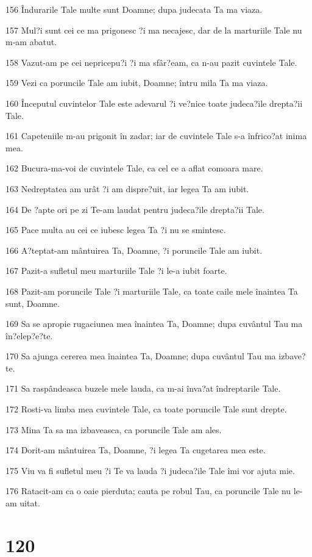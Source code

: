 \par 156 Îndurarile Tale multe sunt Doamne; dupa judecata Ta ma viaza.
\par 157 Mul?i sunt cei ce ma prigonesc ?i ma necajesc, dar de la marturiile Tale nu m-am abatut.
\par 158 Vazut-am pe cei nepricepu?i ?i ma sfâr?eam, ca n-au pazit cuvintele Tale.
\par 159 Vezi ca poruncile Tale am iubit, Doamne; întru mila Ta ma viaza.
\par 160 Începutul cuvintelor Tale este adevarul ?i ve?nice toate judeca?ile drepta?ii Tale.
\par 161 Capeteniile m-au prigonit în zadar; iar de cuvintele Tale s-a înfrico?at inima mea.
\par 162 Bucura-ma-voi de cuvintele Tale, ca cel ce a aflat comoara mare.
\par 163 Nedreptatea am urât ?i am dispre?uit, iar legea Ta am iubit.
\par 164 De ?apte ori pe zi Te-am laudat pentru judeca?ile drepta?ii Tale.
\par 165 Pace multa au cei ce iubesc legea Ta ?i nu se smintesc.
\par 166 A?teptat-am mântuirea Ta, Doamne, ?i poruncile Tale am iubit.
\par 167 Pazit-a sufletul meu marturiile Tale ?i le-a iubit foarte.
\par 168 Pazit-am poruncile Tale ?i marturiile Tale, ca toate caile mele înaintea Ta sunt, Doamne.
\par 169 Sa se apropie rugaciunea mea înaintea Ta, Doamne; dupa cuvântul Tau ma în?elep?e?te.
\par 170 Sa ajunga cererea mea înaintea Ta, Doamne; dupa cuvântul Tau ma izbave?te.
\par 171 Sa raspândeasca buzele mele lauda, ca m-ai înva?at îndreptarile Tale.
\par 172 Rosti-va limba mea cuvintele Tale, ca toate poruncile Tale sunt drepte.
\par 173 Mina Ta sa ma izbaveasca, ca poruncile Tale am ales.
\par 174 Dorit-am mântuirea Ta, Doamne, ?i legea Ta cugetarea mea este.
\par 175 Viu va fi sufletul meu ?i Te va lauda ?i judeca?ile Tale îmi vor ajuta mie.
\par 176 Ratacit-am ca o oaie pierduta; cauta pe robul Tau, ca poruncile Tale nu le-am uitat.

\chapter{120}

